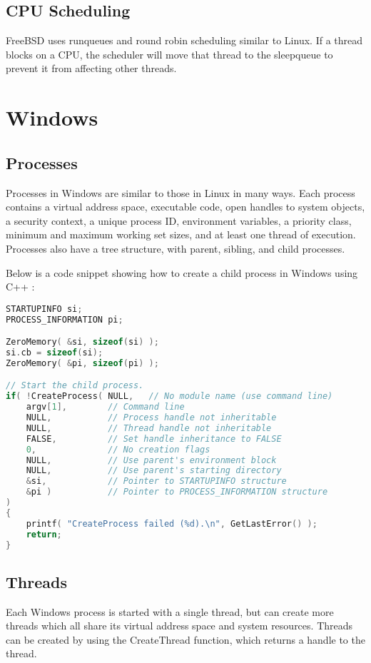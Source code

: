 \documentclass[letterpaper,draftclsnofoot,10pt,onecolumn,titlepage]{IEEEtran}\usepackage[margin=0.75in]{geometry}
\begin{document}
    \subsection{CPU Scheduling}
    FreeBSD uses runqueues and round robin scheduling similar to Linux. If a thread blocks on a CPU, the scheduler
    will move that thread to the sleepqueue to prevent it from affecting other threads.

\section{Windows}
    \subsection{Processes}
    Processes in Windows are similar to those in Linux in many ways. Each process contains a virtual address space,
    executable code, open handles to system objects, a security context, a unique process ID, environment variables,
    a priority class, minimum and maximum working set sizes, and at least one thread of execution. Processes also
    have a tree structure, with parent, sibling, and child processes.

    Below is a code snippet showing how to create a child process in Windows using C++ \cite{windowsprocesses}:
\begin{lstlisting}[language=C++]
STARTUPINFO si;
PROCESS_INFORMATION pi;

ZeroMemory( &si, sizeof(si) );
si.cb = sizeof(si);
ZeroMemory( &pi, sizeof(pi) );

// Start the child process.
if( !CreateProcess( NULL,   // No module name (use command line)
    argv[1],        // Command line
    NULL,           // Process handle not inheritable
    NULL,           // Thread handle not inheritable
    FALSE,          // Set handle inheritance to FALSE
    0,              // No creation flags
    NULL,           // Use parent's environment block
    NULL,           // Use parent's starting directory
    &si,            // Pointer to STARTUPINFO structure
    &pi )           // Pointer to PROCESS_INFORMATION structure
)
{
    printf( "CreateProcess failed (%d).\n", GetLastError() );
    return;
}
\end{lstlisting}

    \subsection{Threads}
    Each Windows process is started with a single thread, but can create more threads which all share its virtual
    address space and system resources. Threads can be created by using the CreateThread function, which returns a
    handle to the thread.
    
\end{document}
